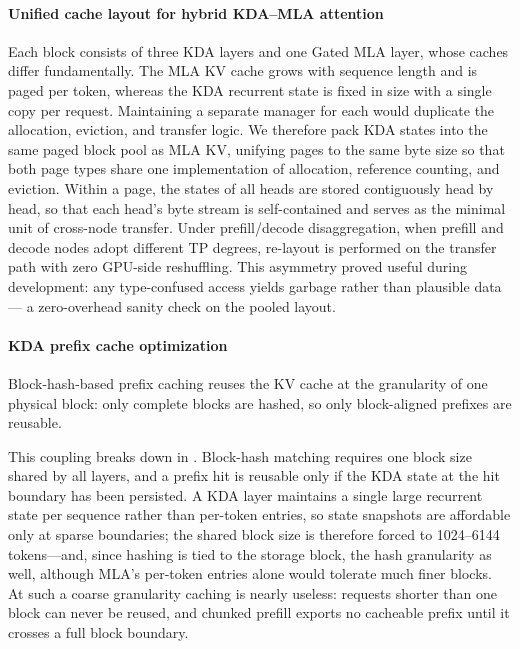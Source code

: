 \paragraph{Unified cache layout for hybrid KDA--MLA attention}
Each  block consists of three KDA layers and one Gated MLA layer, whose caches differ fundamentally.
The MLA KV cache grows with sequence length and is paged per token, whereas the KDA recurrent state is fixed in size with a single copy per request.
Maintaining a separate manager for each would duplicate the allocation, eviction, and transfer logic.
We therefore pack KDA states into the same paged block pool as MLA KV, unifying pages to the same byte size so that both page types share one implementation of allocation, reference counting, and eviction.
Within a page, the states of all heads are stored contiguously head by head, so that each head's byte stream is self-contained and serves as the minimal unit of cross-node transfer.
Under prefill/decode disaggregation, when prefill and decode nodes adopt different TP degrees, re-layout is performed on the transfer path with zero GPU-side reshuffling.
This asymmetry proved useful during development: any type-confused access yields garbage rather than plausible data --- a zero-overhead sanity check on the pooled layout.


\paragraph{KDA prefix cache optimization}





Block-hash-based prefix caching reuses the KV cache at the granularity
of one physical block: only complete blocks are hashed, so only
block-aligned prefixes are reusable.

This coupling breaks down in . Block-hash matching requires
one block size shared by all layers, and a prefix hit is reusable only
if the KDA state at the hit boundary has been persisted. A KDA layer
maintains a single large recurrent state per sequence rather than
per-token entries, so state snapshots are affordable only at sparse
boundaries; the shared block size is therefore forced to 1024--6144
tokens---and, since hashing is tied to the storage block, the hash
granularity as well, although MLA's per-token entries alone would
tolerate much finer blocks. At such a coarse granularity caching is
nearly useless: requests shorter than one block can never be reused,
and chunked prefill exports no cacheable prefix until it crosses a
full block boundary.


